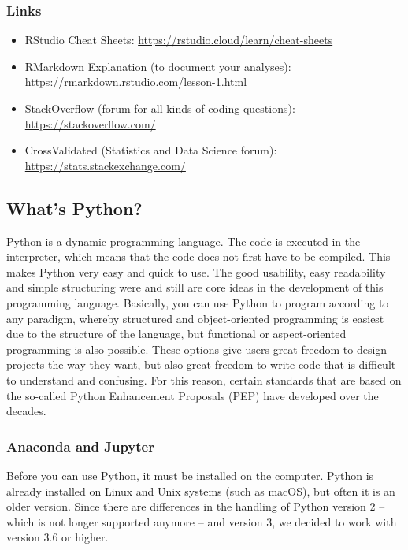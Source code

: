 \documentclass[
  11pt,
]{article}
\providecommand{\tightlist}{%
  \setlength{\itemsep}{0pt}\setlength{\parskip}{0pt}}
\begin{document}
\hypertarget{links}{%
\subsubsection{Links}\label{links}}

\begin{itemize}
\tightlist
\item
  RStudio Cheat Sheets: \url{https://rstudio.cloud/learn/cheat-sheets}
\item
  RMarkdown Explanation (to document your analyses): \url{https://rmarkdown.rstudio.com/lesson-1.html}
\item
  StackOverflow (forum for all kinds of coding questions): \url{https://stackoverflow.com/}
\item
  CrossValidated (Statistics and Data Science forum): \url{https://stats.stackexchange.com/}
\end{itemize}

\hypertarget{whats-python}{%
\subsection{What's Python?}\label{whats-python}}

Python is a dynamic programming language. The code is executed in the interpreter, which means that the code does not first have to be compiled. This makes Python very easy and quick to use. The good usability, easy readability and simple structuring were and still are core ideas in the development of this programming language.
Basically, you can use Python to program according to any paradigm, whereby structured and object-oriented programming is easiest due to the structure of the language, but functional or aspect-oriented programming is also possible. These options give users great freedom to design projects the way they want, but also great freedom to write code that is difficult to understand and confusing. For this reason, certain standards that are based on the so-called Python Enhancement Proposals (PEP) have developed over the decades.

\hypertarget{anaconda-and-jupyter}{%
\subsubsection{Anaconda and Jupyter}\label{anaconda-and-jupyter}}

Before you can use Python, it must be installed on the computer. Python is already installed on Linux and Unix systems (such as macOS), but often it is an older version. Since there are differences in the handling of Python version 2 -- which is not longer supported anymore -- and version 3, we decided to work with version 3.6 or higher.
\end{document}
